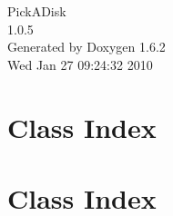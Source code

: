 \documentclass[a4paper]{book}
\begin{document}
\hypersetup{pageanchor=false}
\begin{titlepage}
\vspace*{7cm}
\begin{center}
{\Large PickADisk \\[1ex]\large 1.0.5 }\\
\vspace*{1cm}
{\large Generated by Doxygen 1.6.2}\\
\vspace*{0.5cm}
{\small Wed Jan 27 09:24:32 2010}\\
\end{center}
\end{titlepage}
\clearemptydoublepage
{}
\tableofcontents
\clearemptydoublepage
{}
\hypersetup{pageanchor=true}
\chapter{Class Index}

\chapter{Class Index}

\end{document}
